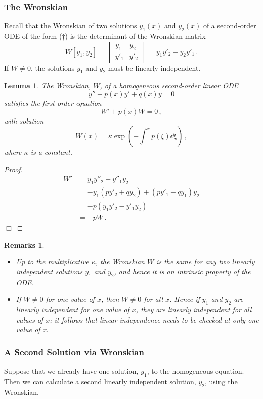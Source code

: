 \documentclass{article}
\theoremstyle{plain}\theoremheaderfont{\normalfont\itshape}\theorembodyfont{\rmfamily}\theoremseparator{.}\newtheorem*{rem}{Remark}\newtheorem*{ex}{Example}\newtheorem*{proof}{Proof}\newtheorem*{altp}{Alternative proof}
\theoremstyle{plain}\theoremheaderfont{\normalfont\bfseries}\theorembodyfont{\rmfamily}\theoremseparator{.}\newtheorem{thm}{Theorem}[section]\newtheorem{lem}[thm]{Lemma}\newtheorem{prop}[thm]{Proposition}\newtheorem*{cor}{Corollary}\newtheorem{defn}[thm]{Definition}\newtheorem{clm}[thm]{Claim}\newtheorem{clminproof}{Claim}
\theoremstyle{break}\theoremheaderfont{\normalfont\itshape}\theorembodyfont{\rmfamily}\theoremseparator{.\medskip}\newtheorem*{proofskip}{Proof}\newtheorem*{exs}{Examples}\newtheorem*{rems}{Remarks}
\theoremstyle{break}\theoremheaderfont{\normalfont\bfseries}\theorembodyfont{\rmfamily}\theoremseparator{.\medskip}\newtheorem{lemskip}[thm]{Lemma}\newtheorem{defnskip}[thm]{Definition}\newtheorem{propskip}[thm]{Proposition}\newtheorem{thmskip}[thm]{Theorem}
\numberwithin{equation}{section}
\newcommand{\qed}{\hfill\ensuremath{\Box}}
\begin{document}
	\subsubsection{The Wronskian}
	Recall that the Wronskian of two solutions \(y_1(x)\) and \(y_2(x)\) of a second-order ODE of the form (\(\dagger\)) is the determinant of the Wronskian matrix
	\[W[y_1,y_2]=\begin{vmatrix}
		y_1 & y_2\\
		y'_1 & y'_2
	\end{vmatrix}=y_1y'_2-y_2y'_1\,.\]
	If \(W\ne 0\), the solutions \(y_1\) and \(y_2\) must be linearly independent.
	\begin{lem}
		The Wronskian, \(W\), of a homogeneous second-order linear ODE
		\begin{equation}\tag{\(\dagger\)}
			y''+p(x)y'+q(x)y=0
		\end{equation}
		satisfies the first-order equation
		\[W'+p(x)W=0\,,\]
		with solution
		\[W(x)=\kappa\exp(-\int^x p(\xi)\dd{\xi})\,,\]
		where \(\kappa\) is a constant.
	\end{lem}
	\begin{proof}
		\begin{align*}
			W'&=y_1y''_2-y''_1y_2\\
			&=-y_1(py'_2+qy_2)+(py'_1+qy_1)y_2\\
			&=-p(y_1y'_2-y'_1y_2)\\
			&=-pW\,.
		\end{align*}\qed
	\end{proof}
	\begin{rems}
		\begin{itemize}[topsep=0pt]
			\item Up to the multiplicative \(\kappa\), the Wronskian \(W\) is the same for any two linearly independent solutions \(y_1\) and \(y_2\), and hence it is an intrinsic property of the ODE.
			\item If \(W\ne 0\) for one value of \(x\), then \(W\ne 0\) for all \(x\). Hence if \(y_1\) and \(y_2\) are linearly independent for one value of \(x\), they are linearly independent for all values of \(x\); it follows that linear independence needs to be checked at only one value of x.
		\end{itemize}
	\end{rems}
	
	\subsubsection{A Second Solution via Wronskian}
	Suppose that we already have one solution, \(y_1\), to the homogeneous equation. Then we can calculate a second linearly independent solution, \(y_2\), using the Wronskian.
\end{document}
